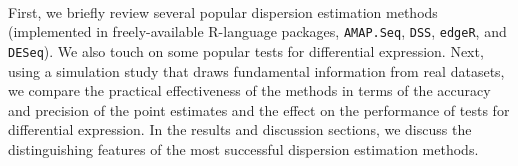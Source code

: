 \documentclass[10pt]{article}
\begin{document}
\paragraph{} \indent %
First, we briefly review several popular dispersion estimation methods (implemented in freely-available R-language packages, {\tt AMAP.Seq}, {\tt DSS}, {\tt edgeR}, and {\tt DESeq}).%
 We also touch on some popular tests for differential expression. Next, using a simulation study that draws fundamental information from real datasets, %
 we compare the practical effectiveness of the methods in terms of the accuracy and precision of the point estimates and the effect on the performance of tests for differential expression. In the results and discussion sections, %
 we discuss the distinguishing features of the most successful dispersion estimation methods.
\end{document}
